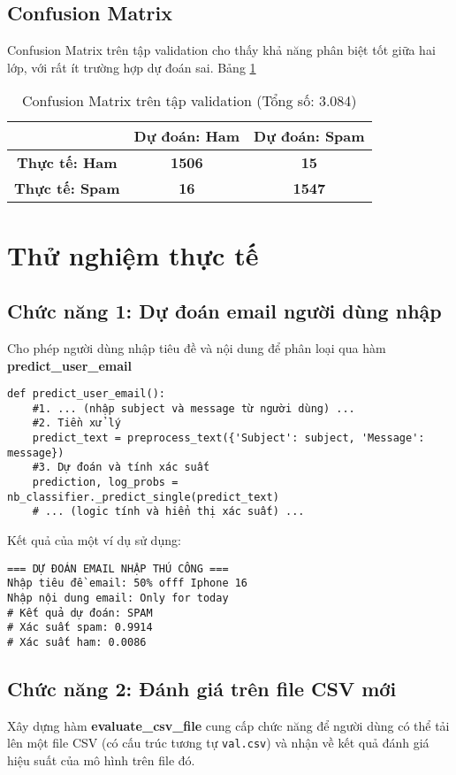\subsection{Confusion Matrix}
Confusion Matrix trên tập validation cho thấy khả năng phân biệt tốt giữa hai lớp, với rất ít trường hợp dự đoán sai. Bảng \ref{fig:confusion_matrix}

\begin{table}[H]
\centering
\begin{tabular}{|c|c|c|}
\hline
& \textbf{Dự đoán: Ham} & \textbf{Dự đoán: Spam} \\
\hline
\textbf{Thực tế: Ham} & \textbf{1506} & \textbf{15} \\
\hline
\textbf{Thực tế: Spam} & \textbf{16} & \textbf{1547} \\
\hline
\end{tabular}
\caption{Confusion Matrix trên tập validation (Tổng số: 3.084)}
\label{fig:confusion_matrix}
\end{table}

\section{Thử nghiệm thực tế}

\subsection{Chức năng 1: Dự đoán email người dùng nhập}
Cho phép người dùng nhập tiêu đề và nội dung để phân loại qua hàm \textbf{predict\_user\_email}
\begin{verbatim}
def predict_user_email():
    #1. ... (nhập subject và message từ người dùng) ...
    #2. Tiền xử lý
    predict_text = preprocess_text({'Subject': subject, 'Message': message})
    #3. Dự đoán và tính xác suất
    prediction, log_probs = nb_classifier._predict_single(predict_text)
    # ... (logic tính và hiển thị xác suất) ...
\end{verbatim}

Kết quả của một ví dụ sử dụng:
\begin{verbatim}
=== DỰ ĐOÁN EMAIL NHẬP THỦ CÔNG ===
Nhập tiêu đề email: 50% offf Iphone 16
Nhập nội dung email: Only for today
# Kết quả dự đoán: SPAM
# Xác suất spam: 0.9914
# Xác suất ham: 0.0086
\end{verbatim}

\subsection{Chức năng 2: Đánh giá trên file CSV mới}
Xây dựng hàm \textbf{evaluate\_csv\_file} cung cấp chức năng để người dùng có thể tải lên một file CSV (có cấu trúc tương tự \texttt{val.csv}) và nhận về kết quả đánh giá hiệu suất của mô hình trên file đó.

